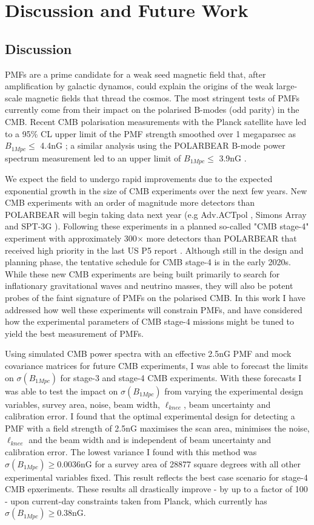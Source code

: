 \section{Discussion and Future Work}
\subsection{Discussion}

PMFs are a prime candidate for a weak seed magnetic field that, after amplification by galactic dynamos, could explain the origins of the weak large-scale magnetic fields that thread the cosmos. The most stringent tests of PMFs currently come from their impact on the polarised B-modes (odd parity) in the CMB. Recent CMB polarisation measurements with the Planck satellite have led to a 95\% CL upper limit of the PMF strength smoothed over 1 megaparsec as $B_{1Mpc} \leq$ 4.4nG \cite{Ade:2015cva}; a similar analysis using the POLARBEAR B-mode power spectrum measurement led to an upper limit of $B_{1Mpc} \leq$ 3.9nG \cite{Ade:2015cao}.

We expect the field to undergo rapid improvements due to the expected exponential growth in the size of CMB experiments over the next few years. New CMB experiments with an order of magnitude more detectors than POLARBEAR will begin taking data next year (e.g Adv.ACTpol \cite{Henderson:2015nzj}, Simons Array \cite{Suzuki:2015zzg} and SPT-3G \cite{Benson:2014qhw}). Following these experiments in a planned so-called "CMB stage-4" experiment with approximately 300$\times$ more detectors than POLARBEAR that received high priority in the last US P5 report \cite{p5}.
Although still in the design and planning phase, the tentative schedule for CMB stage-4 is in the early 2020s. While these new CMB experiments are being built primarily to search for inflationary gravitational waves and neutrino masses, they will also be potent probes of the faint signature of PMFs on the polarised CMB. In this work I have addressed how well these experiments will constrain PMFs, and have considered how the experimental parameters of CMB stage-4 missions might be tuned to yield the best measurement of PMFs.

Using simulated CMB power spectra with an effective 2.5nG PMF and mock covariance matrices for future CMB experiments, I was able to forecast the limits on $\sigma(B_{1Mpc})$ for stage-3 and stage-4 CMB experiments. With these forecasts I was able to test the impact on $\sigma(B_{1Mpc})$ from varying the experimental design variables, survey area, noise, beam width, $\ell_{knee}$, beam uncertainty and calibration error. I found that the optimal experimental design for detecting a PMF with a field strength of 2.5nG maximises the scan area, minimises the noise, $\ell_{knee}$ and the beam width and is independent of beam uncertainty and calibration error. The lowest variance I found with this method was $\sigma(B_{1Mpc}) \geq 0.0036$nG for a survey area of 28877 square degrees with all other experimental variables fixed. This result reflects the best case scenario for stage-4 CMB epxeriments. These results all drastically improve - by up to a factor of 100 - upon current-day constraints taken from Planck, which currently has $\sigma(B_{1Mpc}) \geq 0.38$nG.

